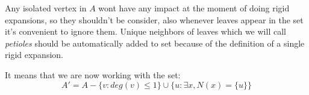 Any isolated vertex in $A$ wont have any impact at the moment of doing rigid expansions, so they shouldn't be consider, also whenever leaves appear in the set it's convenient to ignore them. Unique neighbors of leaves which we will call \textit{petioles} should be automatically added to set because of the definition of a single rigid expansion.

It means that we are now working with the set:
$$A' = A - \{v: deg(v)\leq 1 \} \cup \{u: \exists x, N(x)=\{u\}\} $$

